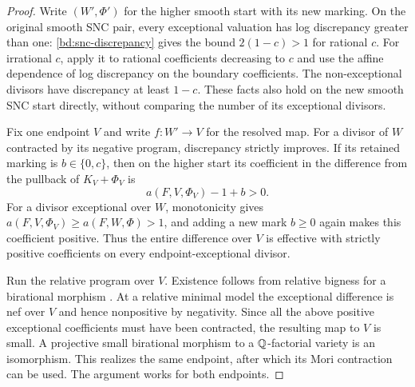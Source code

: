 \begin{proof}
Write $(W',\Phi')$ for the higher smooth start with its new marking.
On the original smooth SNC pair, every exceptional valuation
has log discrepancy greater than one: \eqref{bd:snc-discrepancy}
gives the bound $2(1-c)>1$ for rational $c$. For irrational $c$,
apply it to rational coefficients decreasing to $c$ and use the
affine dependence of log discrepancy on the boundary coefficients.
The non-exceptional divisors
have discrepancy at least $1-c$.  These facts also hold on
the new smooth SNC start directly, without comparing the
number of its exceptional divisors.

Fix one endpoint $V$ and write $f:W'\to V$ for the resolved map.
For a divisor of $W$ contracted by
its negative program, discrepancy strictly improves.  If
its retained marking is $b\in\{0,c\}$, then on the higher
start its coefficient in the difference from the pullback
of $K_V+\Phi_V$ is
\[
                         a(F,V,\Phi_V)-1+b>0.
\]
For a divisor exceptional over $W$, monotonicity gives
$a(F,V,\Phi_V)\geq a(F,W,\Phi)>1$, and adding a new mark
$b\geq0$ again makes this coefficient positive.  Thus the
entire difference over $V$ is effective with strictly
positive coefficients on every endpoint-exceptional divisor.

Run the relative program over $V$.  Existence follows from
relative bigness for a birational morphism
\cite[Theorem~1.2]{BCHM10}.  At a relative minimal model the
exceptional difference is nef over $V$ and hence nonpositive
by negativity.  Since all the above positive exceptional
coefficients must have been contracted, the resulting map
to $V$ is small.  A projective small birational morphism to
a $\mathbb Q$-factorial variety is an isomorphism.  This realizes
the same endpoint, after which its Mori contraction can be
used.  The argument works for both endpoints.


\end{proof}
